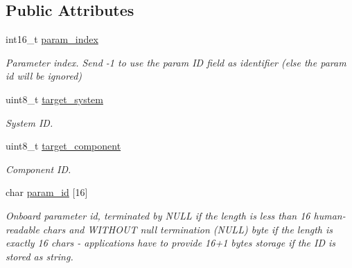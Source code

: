 \subsection*{Public Attributes}
\begin{DoxyCompactItemize}
\item 
\hypertarget{struct____mavlink__param__request__read__t_aef0bfa3c1d8457e0b417fa87b31f3c22}{int16\+\_\+t \hyperlink{struct____mavlink__param__request__read__t_aef0bfa3c1d8457e0b417fa87b31f3c22}{param\+\_\+index}}\label{struct____mavlink__param__request__read__t_aef0bfa3c1d8457e0b417fa87b31f3c22}

\begin{DoxyCompactList}\small\item\em Parameter index. Send -\/1 to use the param I\+D field as identifier (else the param id will be ignored) \end{DoxyCompactList}\item 
\hypertarget{struct____mavlink__param__request__read__t_adc4407f944beba256a385768ea61e588}{uint8\+\_\+t \hyperlink{struct____mavlink__param__request__read__t_adc4407f944beba256a385768ea61e588}{target\+\_\+system}}\label{struct____mavlink__param__request__read__t_adc4407f944beba256a385768ea61e588}

\begin{DoxyCompactList}\small\item\em System I\+D. \end{DoxyCompactList}\item 
\hypertarget{struct____mavlink__param__request__read__t_aa865f64059877480b11a2f476d1a8ca4}{uint8\+\_\+t \hyperlink{struct____mavlink__param__request__read__t_aa865f64059877480b11a2f476d1a8ca4}{target\+\_\+component}}\label{struct____mavlink__param__request__read__t_aa865f64059877480b11a2f476d1a8ca4}

\begin{DoxyCompactList}\small\item\em Component I\+D. \end{DoxyCompactList}\item 
\hypertarget{struct____mavlink__param__request__read__t_a4b68020afd08464492f33950e77d9219}{char \hyperlink{struct____mavlink__param__request__read__t_a4b68020afd08464492f33950e77d9219}{param\+\_\+id} \mbox{[}16\mbox{]}}\label{struct____mavlink__param__request__read__t_a4b68020afd08464492f33950e77d9219}

\begin{DoxyCompactList}\small\item\em Onboard parameter id, terminated by N\+U\+L\+L if the length is less than 16 human-\/readable chars and W\+I\+T\+H\+O\+U\+T null termination (N\+U\+L\+L) byte if the length is exactly 16 chars -\/ applications have to provide 16+1 bytes storage if the I\+D is stored as string. \end{DoxyCompactList}\end{DoxyCompactItemize}


